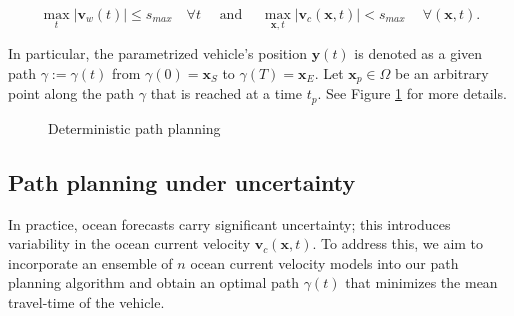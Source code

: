 \documentclass[pdflatex,sn-mathphys-num]{sn-jnl}%
\def \bx{{\mathbf {x}}}
\def \by{{\mathbf {y}}}
\def \bv{{\mathbf {v}}}
\theoremstyle{thmstyleone}%
\theoremstyle{thmstyletwo}%
\theoremstyle{thmstylethree}%
\begin{document}
\begin{equation}
{\max\limits_{t}|\bv_w(t)|  \leq } s_{max} \quad  \forall t \quad  \text{ and } \quad 
{ \max\limits_{\bx,t}}|\bv_{c}(\bx,t)| { < } s_{max} \quad \   \forall (\bx,t).  
\label{eqn:transport_ode_condition}
\end{equation}

In particular, the parametrized vehicle's position $\by(t)$ is denoted as a given path $\gamma:=\gamma(t)$ from $\gamma(0) = \bx_S$ to $\gamma(T) = \bx_E$. Let $\bx_p \in \Omega$ be an arbitrary point along the path $\gamma$ that is reached at a time $t_p$.  See Figure \ref{fig:detpathplanningproblem} for more details.

\begin{figure}[!ht]
\centering

\caption{Deterministic path planning}
\label{fig:detpathplanningproblem}
\end{figure}


\subsection{Path planning under uncertainty}
In practice,  ocean forecasts carry significant uncertainty; this introduces variability in the ocean current velocity $\bv_c(\bx,t)$. To address this, we aim to incorporate an ensemble of $n$ ocean current velocity models into our path planning algorithm and obtain an optimal path $\gamma(t)$ that minimizes the mean travel-time of the vehicle.  
\end{document}
